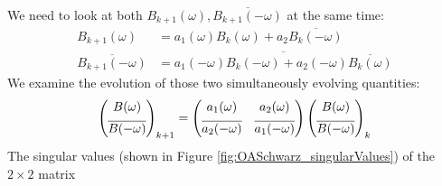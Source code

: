 We need to look at both
$B_{k+1}(\omega), \overline{B_{k+1}(-{\omega})}$
at the same time:
\begin{equation}
	\begin{aligned}
		B_{k+1}(\omega) &= a_1(\omega) B_{k}(\omega) + a_2
		\overline{B_{k}(-{\omega})}\\
		\overline{B_{k+1}(-{\omega})} &=
		\overline{a_1(-{\omega})
			B_{k}(-{\omega})
		+ {a_2(-{\omega})} \overline{B_{k}(\omega)}}
	\end{aligned}
\end{equation}
We examine the evolution of those two
simultaneously evolving quantities:
\begin{equation}
	\label{eq:OASchwarz_transitionMatrixDD26}
\begin{pmatrix}
	B(\omega) \vspace{0.15cm}\\
	\overline{B(-{\omega})}
\end{pmatrix}_{k+1}
 =
\begin{pmatrix}
	a_1(\omega) & a_2(\omega) \vspace{0.15cm}\\
	\overline{a_2(-{\omega})} & \overline{a_1(-{\omega})} \\
\end{pmatrix}
\begin{pmatrix}
	B(\omega) \vspace{0.15cm}\\
	\overline{B(-{\omega})}
\end{pmatrix}_{k}
\end{equation}
The singular values (shown in Figure \ref{fig:OASchwarz_singularValues})
of the $2\times 2$ matrix
